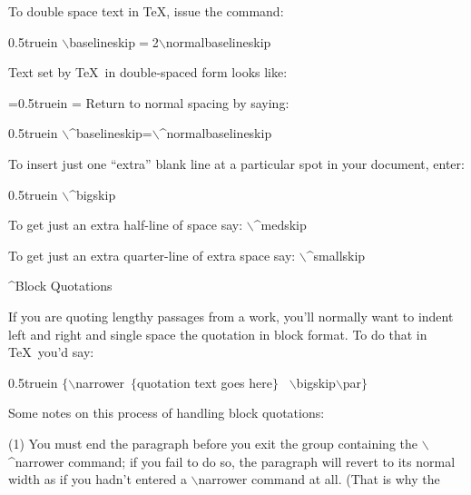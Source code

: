 \bigskip\par\noindent
To double space text in \TeX{}, issue the command:
\bigskip\par\noindent\hglue 0.5truein
{\twltt $\backslash$baselineskip$=$2$\backslash$normalbaselineskip}
\bigskip\par\noindent
Text set by \TeX\ in double-spaced form looks like:
\medskip\par\noindent
{\parindent=0.5truein}
\baselineskip=\normalbaselineskip
Return to normal spacing by saying:
\bigskip\par\noindent\hglue 0.5truein
{\twltt $\backslash$^{baselineskip}=$\backslash$^{normalbaselineskip}}
\bigskip\bigskip\bigskip\par\noindent
To insert just one ``extra'' blank line at a particular
spot in your document, enter: 
\bigskip\par\noindent\hglue 0.5truein
{\twltt $\backslash$^{bigskip}}
\bigskip\par\noindent
To get just an extra {\twlit half}-line of space say:
{\twltt$\backslash$^{medskip}}
\bigskip\par\noindent
To get just an extra {\twlit quarter}-line of extra space say:
{\twltt $\backslash$^{smallskip}}
\vfill\eject
\centerline{\twlbf ^{Block Quotations}}
\bigskip\par\noindent
If you are quoting lengthy passages from a work, you'll normally want
to indent left and right 
and single space the quotation in block format. To do that 
in \TeX\ you'd say:
\bigskip\par\noindent\hglue 0.5truein
{\twltt $\{${}$\backslash$narrower\ $\{${\twlit{}quotation text goes here}$\}$%
\ $\backslash$bigskip$\backslash$par$\}$}
\bigskip\par\noindent
Some notes on this process of handling block quotations: 
\bigskip\par\noindent
(1) You {\twlbf must}
end the paragraph before you exit the group containing the 
{\twltt $\backslash$^{narrower}} command; if you fail to 
do so, the paragraph will revert to its normal width as
if you hadn't entered a {\twltt $\backslash$narrower} command
at all. (That is why the 
